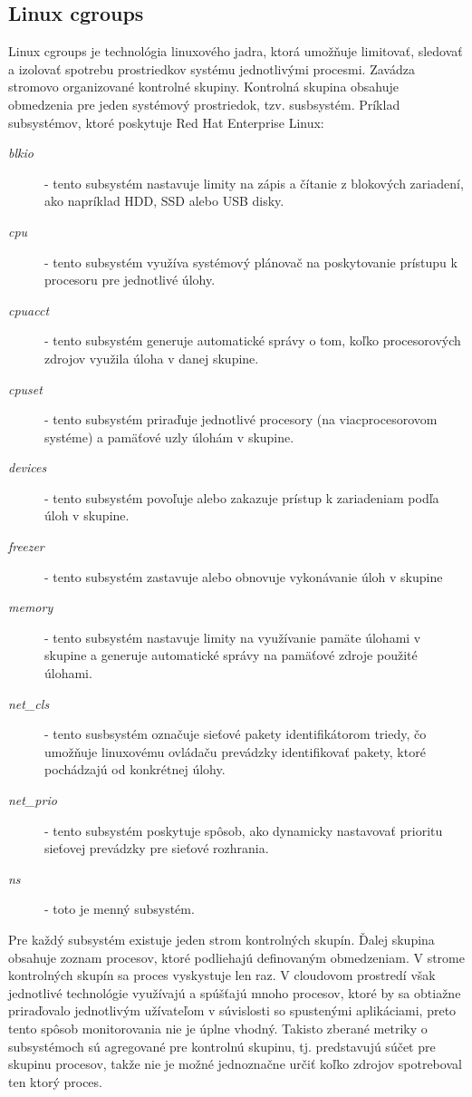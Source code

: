 \documentclass[11pt,final,oneside]{fithesis}
\begin{document}
\subsection{Linux cgroups}
Linux cgroups je technológia linuxového jadra, ktorá umožňuje limitovať, sledovať a izolovať spotrebu prostriedkov systému jednotlivými procesmi. Zavádza stromovo organizované kontrolné skupiny. 
Kontrolná skupina obsahuje obmedzenia pre jeden systémový prostriedok, tzv. susbsystém. Príklad subsystémov, ktoré poskytuje Red Hat Enterprise Linux: 
\begin{description}
\item[\emph{blkio}] - tento subsystém nastavuje limity na zápis a čítanie z blokových zariadení, ako napríklad HDD, SSD alebo USB disky.
\item[\emph{cpu}] - tento subsystém využíva systémový plánovač na poskytovanie prístupu k procesoru pre jednotlivé úlohy.
\item[\emph{cpuacct}] - tento subsystém generuje automatické správy o tom, koľko procesorových zdrojov využila úloha v danej skupine.
\item[\emph{cpuset}] - tento subsystém priraďuje jednotlivé procesory (na viacprocesorovom systéme) a pamäťové uzly úlohám v skupine.
\item[\emph{devices}] - tento subsystém povoľuje alebo zakazuje prístup k zariadeniam podľa úloh v skupine.
\item[\emph{freezer}] - tento subsystém zastavuje alebo obnovuje vykonávanie úloh v skupine
\item[\emph{memory}] - tento subsystém nastavuje limity na využívanie pamäte úlohami v skupine a generuje automatické správy na pamäťové zdroje použité úlohami.
\item[\emph{net\_cls}] - tento susbsystém označuje sieťové pakety identifikátorom triedy, čo umožňuje linuxovému ovládaču prevádzky identifikovať pakety, ktoré pochádzajú od konkrétnej úlohy.
\item[\emph{net\_prio}] - tento subsystém poskytuje spôsob, ako dynamicky nastavovať prioritu sieťovej prevádzky pre sieťové rozhrania.
\item[\emph{ns}] - toto je menný subsystém.
\end{description}
\cite{cgroups}

Pre každý subsystém existuje jeden strom kontrolných skupín. Ďalej skupina obsahuje zoznam procesov, ktoré podliehajú definovaným obmedzeniam. V strome kontrolných skupín sa proces vyskystuje len raz.
V cloudovom prostredí však jednotlivé technológie využívajú a spúšťajú mnoho procesov, ktoré by sa obtiažne priraďovalo jednotlivým užívateľom v súvislosti so spustenými aplikáciami, preto tento spôsob
monitorovania nie je úplne vhodný. Takisto zberané metriky o subsystémoch sú agregované pre kontrolnú skupinu, tj. predstavujú súčet pre skupinu procesov, takže nie je možné jednoznačne určiť koľko zdrojov spotreboval
ten ktorý proces.
\end{document}
